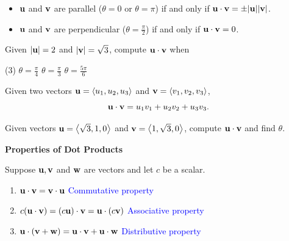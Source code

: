 \documentclass[../mathNotesPreamble]{subfiles}
\begin{document}
  \begin{itemize}
    \item ${\mathbf{u}}$ and ${\mathbf{v}}$ are parallel ($\theta=0$ or $\theta=\pi$) if and only if ${\mathbf{u}}\cdot{\mathbf{v}}=\pm{\left\vert{\mathbf{u}}\right\vert}{\left\vert{\mathbf{v}}\right\vert}$.
    \item ${\mathbf{u}}$ and ${\mathbf{v}}$ are perpendicular ($\theta=\frac{\pi}{2}$) if and only if ${\mathbf{u}}\cdot{\mathbf{v}}=0$.
  \end{itemize}

  \begin{ex*}
    Given ${\left\vert{\mathbf{u}}\right\vert}=2$ and ${\left\vert{\mathbf{v}}\right\vert}=\sqrt 3$, compute ${\mathbf{u}}\cdot{\mathbf{v}}$ when
      \begin{tasks}[after-item-skip=\stretch{1}, label=\textbullet](3)
        \task $\theta=\frac{\pi}{4}$
        \task $\theta=\frac{\pi}{3}$
        \task $\theta=\frac{5\pi}{6}$
      \end{tasks}
  \end{ex*}

  \begin{thmBox*}
    
    Given two vectors ${\mathbf{u}}={\left\langle u_1,u_2,u_3 \right\rangle}$ and ${\mathbf{v}}={\left\langle v_1,v_2,v_3 \right\rangle}$, 
      \[{\mathbf{u}}\cdot{\mathbf{v}}=u_1v_1+u_2v_2+u_3v_3.\]
  \end{thmBox*}
  
  \begin{ex*}
    Given vectors ${\mathbf{u}}={\left\langle \sqrt3,1,0 \right\rangle}$ and ${\mathbf{v}}={\left\langle 1,\sqrt3,0 \right\rangle}$, compute ${\mathbf{u}}\cdot{\mathbf{v}}$ and find $\theta$.
  \end{ex*}
  \pagebreak

  \textbf{Properties of Dot Products}
  
  \begin{thmBox*}
    Suppose ${\mathbf{u}}, {\mathbf{v}}$ and ${\mathbf{w}}$ are vectors and let $c$ be a scalar.
    \begin{center}
      \begin{minipage}{0.7\linewidth}
        \begin{enumerate}
          \item 
            ${\mathbf{u}}\cdot {\mathbf{v}} ={\mathbf{v}}\cdot{\mathbf{u}}$ 
            \tab \textcolor{blue}{Commutative property}
          \item 
            $c{\left({\mathbf{u}}\cdot{\mathbf{v}}\right)}={\left(c{\mathbf{u}}\right)}\cdot {\mathbf{v}}={\mathbf{u}}\cdot{\left(c{\mathbf{v}}\right)}$
            \tab \textcolor{blue}{Associative property}
          \item 
            ${\mathbf{u}}\cdot{\left({\mathbf{v}}+{\mathbf{w}}\right)}={\mathbf{u}}\cdot{\mathbf{v}}+{\mathbf{u}}\cdot{\mathbf{w}}$
            \tab \textcolor{blue}{Distributive property}
        \end{enumerate}
      \end{minipage}
    \end{center}
  \end{thmBox*}
\end{document}
